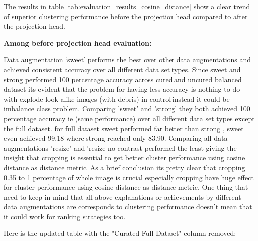 The results in table \ref{tab:evaluation_results_cosine_distance} show a clear trend of superior clustering performance before the projection head compared to after the projection head.

\textbf{Among before projection head evaluation:} 

Data augmentation ‘sweet’ performs the best over other data augmentations and achieved consistent accuracy over all different data set types. Since sweet and strong performed 100 percentage accuracy across cured and uncured balanced dataset its evident that the problem for having less accuracy is nothing to do with explode look alike images (with debris)  in control instead it could be imbalance class problem. Comparing 'sweet' and 'strong' they both achieved 100 percentage accuracy ie (same performance) over all different data set types except the full dataset.
for full dataset sweet performed far better than strong , sweet even achieved 99.18 where strong reached only 83.90. Comparing all data augmentations 'resize' and 'resize no contrast performed the least giving the insight that cropping is essential to get better cluster performance using cosine distance as distance metric. As a brief conclusion its pretty clear that cropping 0.35 to 1 percentage of whole image is crucial especially cropping have huge effect for cluster performance using cosine distance as distance metric. One thing that need to keep in mind that all above explanations or achievements by different data augmentations are corresponds to clustering performance doesn't mean that it could work for ranking strategies too.
    
Here is the updated table with the "Curated Full Dataset" column removed:

